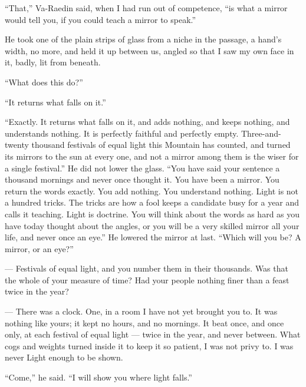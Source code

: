 ``That,'' Va-Raedin said, when I had run out of competence, ``is what a mirror would tell you, if you could teach a mirror to speak.''\par

He took one of the plain strips of glass from a niche in the passage, a hand's width, no more, and held it up between us, angled so that I saw my own face in it, badly, lit from beneath.\par

``What does this do?''\par
``It returns what falls on it.''\par
``Exactly. It returns what falls on it, and adds nothing, and keeps nothing, and understands nothing. It is perfectly faithful and perfectly empty. 
Three-and-twenty thousand festivals of equal light this Mountain has counted, and turned its mirrors to the sun at every one, and not a mirror among them 
is the wiser for a single festival.'' 
He did not lower the glass. 
``You have said your sentence a thousand mornings and never once thought it. 
You have been a mirror. You return the words exactly. You add nothing. You understand nothing.
Light is not a hundred tricks. The tricks are how a fool keeps a candidate busy for a year and calls it teaching. 
Light is doctrine. 
You will think about the words as hard as you have today thought about the angles, or you will be a very skilled mirror all your life, and never once an eye.'' 
He lowered the mirror at last. 
``Which will you be? A mirror, or an eye?''\par

\begin{room}

--- Festivals of equal light, and you number them in their thousands. Was that the whole of your measure of time? Had your people nothing finer than a feast twice in the year?

--- There was a clock. One, in a room I have not yet brought you to. It was nothing like yours; it kept no hours, and no mornings. It beat once, and once only, at each festival of equal light --- twice in the year, and never between. What cogs and weights turned inside it to keep it so patient, I was not privy to. I was never Light enough to be shown.

\end{room}

``Come,'' he said. ``I will show you where light falls.''\par

\ornament

